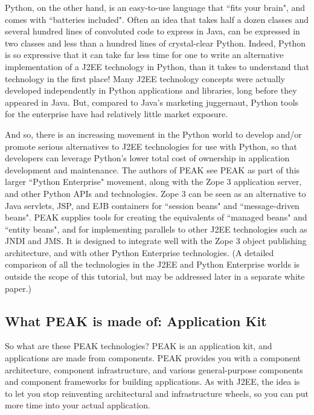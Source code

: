 Python, on the other hand, is an easy-to-use language that ``fits your
brain", and comes with ``batteries included".  Often an idea that takes
half a dozen classes and several hundred lines of convoluted code to
express in Java, can be expressed in two classes and less than a hundred
lines of crystal-clear Python.  Indeed, Python is so expressive that it
can take far less time for one to write an alternative implementation of
a J2EE technology in Python, than it takes to understand that technology
in the first place!  Many J2EE technology concepts were actually
developed independently in Python applications and libraries, long
before they appeared in Java.  But, compared to Java's marketing
juggernaut, Python tools for the enterprise have had relatively little
market exposure. 

And so, there is an increasing movement in the Python world to develop
and/or promote serious alternatives to J2EE technologies for use with
Python, so that developers can leverage Python's lower total cost of
ownership in application development and maintenance. The authors of
PEAK see PEAK as part of this larger ``Python Enterprise" movement, along
with the Zope 3 application server, and other Python APIs and
technologies. Zope 3 can be seen as an alternative to Java servlets,
JSP, and EJB containers for ``session beans" and ``message-driven beans".
PEAK supplies tools for creating the equivalents of ``managed beans" and
``entity beans", and for implementing parallels to other J2EE technologies
such as JNDI and JMS.  It is designed to integrate well with the Zope 3 
object publishing architecture, and with other Python Enterprise
technologies. (A detailed comparison of all the technologies in the J2EE
and Python Enterprise worlds is outside the scope of this tutorial, but
may be addressed later in a separate white paper.) 


\subsection{What PEAK is made of: Application Kit} 

So what are these PEAK technologies? PEAK is an application kit, and
applications are made from components.  PEAK provides you with a
component architecture, component infrastructure, and various
general-purpose components and component frameworks for building
applications. As with J2EE, the idea is to let you stop reinventing
architectural and infrastructure wheels, so you can put more time into
your actual application. 

